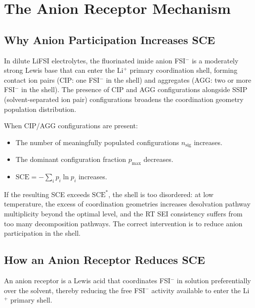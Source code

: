 \documentclass[11pt]{article}
\theoremstyle{plain}
\theoremstyle{definition}
\theoremstyle{remark}
\begin{document}
\section{The Anion Receptor Mechanism}
\label{sec:anion_receptor_theory}

\subsection{Why Anion Participation Increases SCE}

In dilute LiFSI electrolytes, the fluorinated imide anion FSI$^-$ is a
moderately strong Lewis base that can enter the Li$^+$ primary
coordination shell, forming contact ion pairs (CIP: one FSI$^-$ in the
shell) and aggregates (AGG: two or more FSI$^-$ in the shell).  The
presence of CIP and AGG configurations alongside SSIP (solvent-separated
ion pair) configurations broadens the coordination geometry population
distribution.

When CIP/AGG configurations are present:
\begin{itemize}[leftmargin=2em]
  \item The number of meaningfully populated configurations
        $n_{\mathrm{sig}}$ increases.
  \item The dominant configuration fraction $p_{\max}$ decreases.
  \item $\mathrm{SCE} = -\sum_i p_i \ln p_i$ increases.
\end{itemize}

If the resulting SCE exceeds $\mathrm{SCE}^{*}$, the shell is too
disordered: at low temperature, the excess of coordination geometries
increases desolvation pathway multiplicity beyond the optimal level,
and the RT SEI consistency suffers from too many decomposition pathways.
The correct intervention is to reduce anion participation in the shell.

\subsection{How an Anion Receptor Reduces SCE}

An anion receptor is a Lewis acid that coordinates FSI$^-$ in solution
preferentially over the solvent, thereby reducing the free FSI$^-$
activity available to enter the Li$^+$ primary shell.
\end{document}
